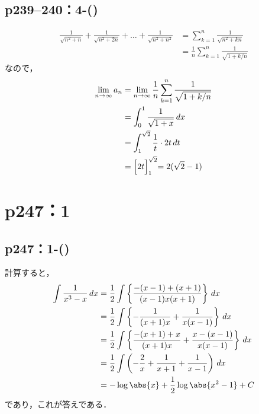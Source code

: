 \documentclass[a4paper,10pt,fleqn]{ltjsarticle}
\begin{document}
\subsection*{p239--240：4-()}

\begin{tleftbar}
    \begin{align*}
        \frac{1}{\sqrt{n^2+n}}+\frac{1}{\sqrt{n^2+2n}}+\dots+\frac{1}{\sqrt{n^2+n^2}} & = \sum_{k=1}^{n} \frac{1}{\sqrt{n^2+kn}}            \\
                                                                                      & = \frac{1}{n} \sum_{k=1}^{n} \frac{1}{\sqrt{1+k/n}}
    \end{align*}
    なので，
    \begin{align*}
        \lim_{n \to \infty} a_n & = \lim_{n \to \infty} \frac{1}{n} \sum_{k=1}^{n} \frac{1}{\sqrt{1+k/n}} \\
                                & =\int_{0}^{1} \frac{1}{\sqrt{1+x}} \, dx                                \\
                                & =\int_{1}^{\sqrt{2}} \frac{1}{t} \cdot 2t \, dt                         \\
                                & = \Bigl[2t \Bigl ]_{1}^{\sqrt{2}} =2(\sqrt{2}-1)
    \end{align*}
\end{tleftbar}


\section*{p247：1}


\subsection*{p247：1-()}

\begin{tleftbar}
    計算すると，
    \begin{align*}
        \int \frac{1}{x^3-x} \, dx & = \frac{1}{2} \int \left \{ \frac{-(x-1)+(x+1)}{(x-1)x(x+1)} \right \} \, dx                 \\
                                   & = \frac{1}{2} \int \left \{ -\frac{1}{(x+1)x}+\frac{1}{x(x-1)} \right \} \, dx               \\
                                   & = \frac{1}{2} \int \left \{ \frac{-(x+1)+x}{(x+1)x} + \frac{x-(x-1)}{x(x-1)} \right \} \, dx \\
                                   & = \frac{1}{2} \int \left ( -\frac{2}{x}+\frac{1}{x+1}+\frac{1}{x-1} \right) \, dx            \\
                                   & = -\log \abs{x} + \frac{1}{2} \log \abs{x^2-1}+ C
    \end{align*}
    であり，これが答えである．
\end{tleftbar}
\end{document}
